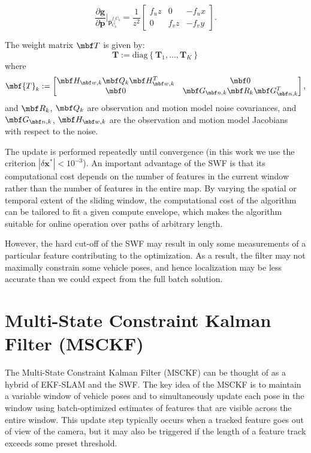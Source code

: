 \documentclass[letterpaper, 10 pt, conference]{ieeeconf}  %
\def\Vec#1{\mathbf{#1}}
\newcommand{\bbm}{\begin{bmatrix}}
\newcommand{\ebm}{\end{bmatrix}}
\newcommand{\pd}[2]{\frac{\partial #1}{\partial #2}}
\begin{document}
\begin{equation}
\pd{\Vec g}{ \Vec p}\Bigr|_{\bar{\Vec p}_{C_k}^{f_j C_k}} = \frac{1}{z^2} \bbm f_u z & 0 & - f_u x \\  0 & f_v z & -f_v y \ebm.
\end{equation}

The weight matrix $\mbf T$ is given by:
\begin{equation}
\Vec{T} := \text{diag} \left\{ \Vec{T}_1,\hdots,\Vec{T}_K \right\}
\end{equation}
where
\begin{equation}
\mbf{T}_k := \bbm \mbf H_{\mbf w, k} \mbf Q_k \mbf H_{\mbf w, k}^T & \mbf 0 \\
\mbf 0 & \mbf G_{\mbf n, k} \mbf R_k \mbf G_{\mbf n, k}^T \ebm,
\end{equation}
and $\mbf R_k$, $\mbf Q_k$ are observation and motion model noise covariances, and $\mbf G_{\mbf n, k}$, $\mbf H_{\mbf w, k}$ are the observation and motion model Jacobians with respect to the noise.

The update is performed repeatedly until convergence (in this work we use the criterion $|\delta \Vec{x}^*| < 10^{-3} $).
An important advantage of the SWF is that its computational cost depends on the number of features in the current window rather than the number of features in the entire map.
By varying the spatial or temporal extent of the sliding window, the computational cost of the algorithm can be tailored to fit a given compute envelope, which makes the algorithm suitable for online operation over paths of arbitrary length.

However, the hard cut-off of the SWF may result in only some measurements of a particular feature contributing to the optimization.
As a result, the filter may not maximally constrain some vehicle poses, and hence localization may be less accurate than we could expect from the full batch solution.

\section{Multi-State Constraint Kalman Filter (MSCKF)} \label{sec:MSCKF}
The Multi-State Constraint Kalman Filter (MSCKF) \cite{Mourikis:2006:TechReport,Mourikis:2007:ICRA} can be thought of as a hybrid of EKF-SLAM and the SWF.
The key idea of the MSCKF is to maintain a variable window of vehicle poses and to simultaneously update each pose in the window using batch-optimized estimates of features that are visible across the entire window.
This update step typically occurs when a tracked feature goes out of view of the camera, but it may also be triggered if the length of a feature track exceeds some preset threshold.
\end{document}
